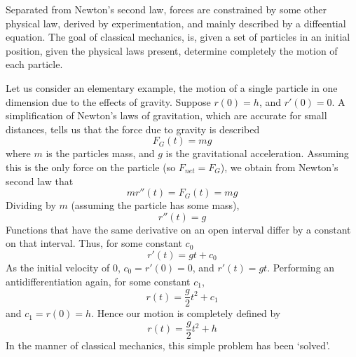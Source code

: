 Separated from Newton's second law, forces are constrained by some other physical law, derived by experimentation, and mainly described by a diffeential equation. The goal of classical mechanics, is, given a set of particles in an initial position, given the physical laws present, determine completely the motion of each particle.

Let us consider an elementary example, the motion of a single particle in one dimension due to the effects of gravity. Suppose $r(0) = h$, and $r'(0) = 0$. A simplification of Newton's laws of gravitation, which are accurate for small distances, tells us that the force due to gravity is described
%
\[ F_G(t) = mg \]
%
where $m$ is the particles mass, and $g$ is the gravitational acceleration. Assuming this is the only force on the particle (so $F_{net} = F_G$), we obtain from Newton's second law that
%
\[ mr''(t) = F_G(t) = mg \]
%
Dividing by $m$ (assuming the particle has some mass),
%
\[ r''(t) = g \]
%
Functions that have the same derivative on an open interval differ by a constant on that interval. Thus, for some constant $c_0$
%
\[ r'(t) = gt + c_0 \]
%
As the initial velocity of $0$, $c_0 = r'(0) = 0$, and $r'(t) = gt$. Performing an antidifferentiation again, for some constant $c_1$,
%
\[ r(t) = \frac{g}{2}t^2 + c_1 \]
%
and $c_1 = r(0) = h$. Hence our motion is completely defined by
%
\[ r(t) = \frac{g}{2}t^2 + h \]
%
In the manner of classical mechanics, this simple problem has been `solved'.

